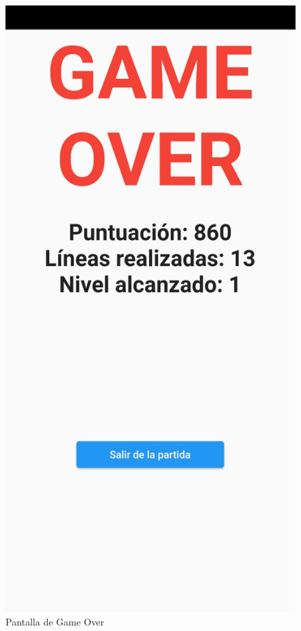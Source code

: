 \documentclass{article}
\begin{document}
\begin{figure}[H]
\center
        \includegraphics[scale=0.3]{imagenes/captura4.jpeg}
        \caption{Pantalla de Game Over}
\end{figure}
\end{document}
